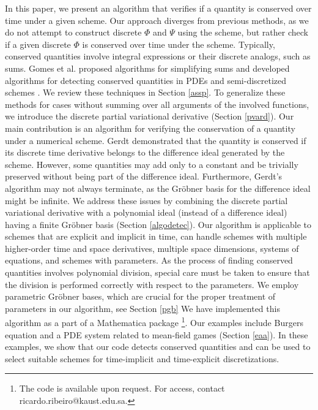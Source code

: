 \documentclass[runningheads]{llncs}
\newcommand{\1}{\chi}
\begin{document}
In this paper, we present an algorithm that verifies if a quantity is conserved over time under a given scheme. Our approach diverges from previous methods, as we do not attempt to construct discrete $\Phi$ and $\Psi$ using the scheme, but rather check if a given discrete $\Phi$ is conserved over time under the scheme. Typically, conserved quantities involve integral expressions or their discrete analogs, such as sums. Gomes et al. proposed algorithms for simplifying sums \cite{gomes20} and developed algorithms for detecting conserved quantities in PDEs and semi-discretized schemes \cite{gomes20}. We review these techniques in Section \ref{assp}.
To generalize these methods for cases without summing over all arguments of the involved functions, we introduce the discrete partial variational derivative (Section \ref{pvard}). Our main contribution is an algorithm for verifying the conservation of a quantity under a numerical scheme. Gerdt \cite{gerdt12} demonstrated that the quantity is conserved if its discrete time derivative belongs to the difference ideal generated by the scheme. However, some quantities may add only to a constant and be trivially preserved without being part of the difference ideal. Furthermore, Gerdt's algorithm may not always terminate, as the Gr{\"o}bner basis for the difference ideal might be infinite.
We address these issues by combining the discrete partial variational derivative with a polynomial ideal (instead of a difference ideal) having a finite Gr{\"o}bner basis (Section \ref{algodetec}). Our algorithm is applicable to schemes that are explicit and implicit in time, can handle schemes with multiple higher-order time and space derivatives, multiple space dimensions, systems of equations, and schemes with parameters.
As the process of finding conserved quantities involves polynomial division, special care must be taken to ensure that the division is performed correctly with respect to the parameters. We employ parametric Gr{\"o}bner  bases, which are crucial for the proper treatment of parameters in our algorithm, see Section \ref{pgb}
 We have implemented this algorithm as a part of a {\sc Mathematica} package \cite{wolfram21}\footnote{The code is available upon request. For access, contact ricardo.ribeiro@kaust.edu.sa.}. Our examples include Burgers equation and a PDE system related to mean-field games (Section \ref{eaa}). In these examples, 
 we show that our code detects conserved quantities and can be used to select suitable schemes for time-implicit and time-explicit discretizations. 
\end{document}
